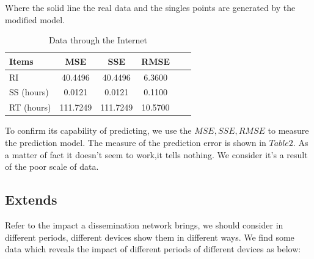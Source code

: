 \par Where the solid line the real data and the singles points are generated by the modified model.

\begin{table}[h-ere]
	\centering%
	\begin{tabular}{lccccc}  %
		\hline
		Items & MSE & SSE   & RMSE\\ \hline  %
		RI   & 40.4496  & 40.4496  & 6.3600 \\         %
		SS (hours)& 0.0121  & 0.0121 & 0.1100 \\        %
		RT (hours) & 111.7249 & 111.7249 & 10.5700   \\
		\hline
	\end{tabular}
	\caption{Data through the Internet}\label{tab:1}
\end{table} 
\par To confirm its capability of predicting, we use the $MSE,SSE,RMSE$ to measure the prediction model. The measure of the prediction error is shown in $Table 2$. As a matter of fact it doesn't seem to work,it tells nothing. We consider it's a result of the poor scale of data.
\subsection*{Extends}
\par Refer to the impact a dissemination network brings, we should consider in different periods, different devices show them in different ways. We find some data which reveals the impact of different periods of different devices as below:



